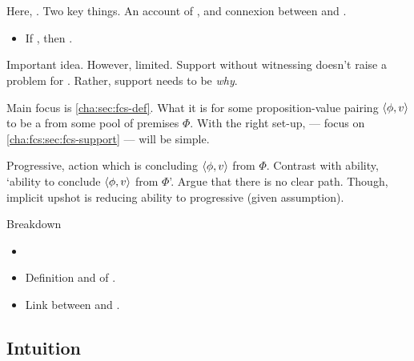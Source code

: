 \chapter{}
\label{cha:fcs}

\nocite{Ryle:1946tu}

\begin{note}
  Here, .
  Two key things.
  An account of , and connexion between  and .

  \begin{itemize}
  \item
    If \fc{}, then \ros{}.
  \end{itemize}

  Important idea.
  However, limited.
  Support without witnessing doesn't raise a problem for \issueConstraint{}.
  Rather, support needs to be \emph{why}.

  Main focus is \autoref{cha:sec:fcs-def}.
  What it is for some proposition-value pairing \(\langle \phi, v \rangle\) to be a \fc{} from some pool of premises \(\Phi\).
  With the right set-up,  --- focus on \autoref{cha:fcs:sec:fcs-support} --- will be simple.

  Progressive, action which is concluding \(\langle \phi, v \rangle\) from \(\Phi\).
  Contrast with ability, `ability to conclude \(\langle \phi, v \rangle\) from \(\Phi\)'.
  Argue that there is no clear path.
  Though, implicit upshot is reducing ability to progressive (given assumption).
\end{note}

\begin{note}
  Breakdown
  \begin{itemize}
  \item
  \item

    Definition and  of .
  \item

    Link between  and .
  \end{itemize}
\end{note}

\section{Intuition}
\label{sec:intuition}

